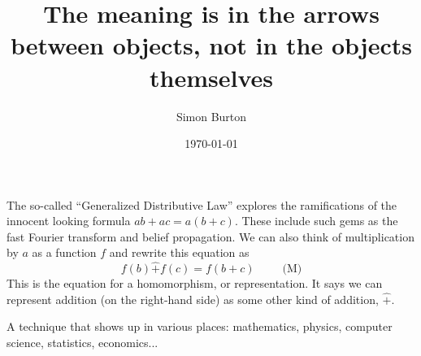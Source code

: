 \documentclass[11pt]{article}
\begin{document}
\title{The meaning is in the arrows between objects, not in the objects themselves}

\author{Simon Burton}

\date{\today}


\maketitle


\def\Z{\mathbb Z}
\def\R{\mathbb R}
\def\Expect{\mathbb E}
\def\Ind{\mathbb I}
\def\Complex{\mathbb{C}}
\def\GL{\mathrm{GL}}
\def\half{\frac{1}{2}}
\def\todo#1{\emph{(XXX #1 XXX)}}


%
%


The so-called ``Generalized Distributive Law''
\cite{Aji2000}
explores the ramifications of the innocent looking
formula $ab+ac = a(b+c).$
These include such gems as the fast Fourier transform
and belief propagation.
We can also think of multiplication by $a$ as a function $f$
and rewrite this equation as 
$$
    f(b)\hat{+}f(c)=f(b+c) \ \ \ \ \ \ \ \ \ \ \ \mbox{(M)}
$$
This is the equation for a homomorphism, or representation.
It says we can represent addition (on the right-hand side)
as some other kind of addition, $\hat{+}.$

A technique that shows up in various places:
mathematics, physics, computer science, statistics, economics...

\end{document}
